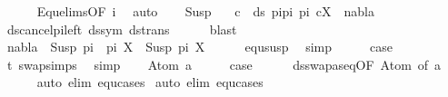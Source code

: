 \begin{isabellebody}
\ \ \ \ \isamarkupfalse%
\ Equ{\isacharunderscore}{\kern0pt}elims{\isacharparenleft}{\kern0pt}{}{\isacharparenright}{\kern0pt}{\isacharbrackleft}{\kern0pt}OF\ i{\isacharbrackright}{\kern0pt}\ \isamarkupfalse%
\ auto\isanewline
\ \ \isamarkupfalse%
\ Susp\ \isamarkupfalse%
\ {\isachardoublequoteopen}{\isasymforall}\ c\ {\isasymin}\ ds\ {\isacharparenleft}{\kern0pt}pi{}{\isacharat}{\kern0pt}pi{\isacharparenright}{\kern0pt}\ pi{\isacharprime}{\kern0pt}{\isachardot}{\kern0pt}\ {\isacharparenleft}{\kern0pt}c{\isacharcomma}{\kern0pt}X{\isacharparenright}{\kern0pt}\ {\isasymin}\ nabla{\isachardoublequoteclose}\isanewline
\ \ \ \ \isamarkupfalse%
\ ds{\isacharunderscore}{\kern0pt}cancel{\isacharunderscore}{\kern0pt}pi{\isacharunderscore}{\kern0pt}left\ ds{\isacharunderscore}{\kern0pt}sym\ ds{\isacharunderscore}{\kern0pt}trans\isanewline
\ \ \ \ \isamarkupfalse%
\ blast\isanewline
\ \ \isamarkupfalse%
\ \isamarkupfalse%
\ {\isachardoublequoteopen}nabla\ {\isasymturnstile}\ Susp\ {\isacharparenleft}{\kern0pt}pi{}\ {\isacharat}{\kern0pt}\ pi{\isacharparenright}{\kern0pt}\ X\ {\isasymapprox}\ Susp\ pi{\isacharprime}{\kern0pt}\ X{\isachardoublequoteclose}\isanewline
\ \ \ \ \isamarkupfalse%
\ equ{\isacharunderscore}{\kern0pt}susp\ \isamarkupfalse%
\ simp\isanewline
\ \ \isamarkupfalse%
\ \isamarkupfalse%
\ {\isacharquery}{\kern0pt}case\ \isamarkupfalse%
\ t{}\ swap{\isachardot}{\kern0pt}simps{\isacharparenleft}{\kern0pt}{}{\isacharparenright}{\kern0pt}\ \isamarkupfalse%
\ simp\isanewline
{}\isamarkupfalse%
\isanewline
\ \ \isamarkupfalse%
\ {\isacharparenleft}{\kern0pt}Atom\ a{\isacharparenright}{\kern0pt}\isanewline
\ \ \isamarkupfalse%
\ \isamarkupfalse%
\ {\isacharquery}{\kern0pt}case\isanewline
\ \ \ \ \isamarkupfalse%
\ ds{\isacharunderscore}{\kern0pt}swapas{\isacharunderscore}{\kern0pt}eq{\isacharbrackleft}{\kern0pt}OF\ Atom{\isacharparenleft}{\kern0pt}{}{\isacharparenright}{\kern0pt}{\isacharcomma}{\kern0pt}\ of\ a{\isacharbrackright}{\kern0pt}\isanewline
\ \ \ \ \isamarkupfalse%
\ {\isacharparenleft}{\kern0pt}auto\ elim{\isacharcolon}{\kern0pt}\ equ{\isachardot}{\kern0pt}cases{\isacharparenright}{\kern0pt}\isanewline
{}\isamarkupfalse%
\ {\isacharparenleft}{\kern0pt}auto\ elim{\isacharcolon}{\kern0pt}\ equ{\isachardot}{\kern0pt}cases{\isacharparenright}{\kern0pt}%

\end{isabellebody}
